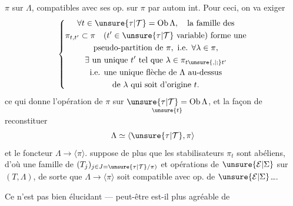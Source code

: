 $\pi$ sur $\Lambda$, compatibles avec ses op. sur $\pi$ par autom int. Pour ceci, on va exiger
\[
\left\{\begin{gathered}
\forall t\in\unsure{\tau|\mathcal T}=\operatorname{Ob}\Lambda,\quad\text{la famille des}\\
\pi_{t,t'}\subset\pi\quad(t'\in\unsure{\tau|\mathcal T}\text{ variable})\text{ forme une}\\
\text{pseudo-partition de }\pi,\text{ i.e. }\forall\lambda\in\pi,\\
\exists\text{ un unique }t'\text{ tel que }\lambda\in\pi_{t\unsure{,|;}t'}\\
\text{i.e. une unique flèche de }\Lambda\text{ au-dessus}\\
\text{de }\lambda\text{ qui soit d'origine }t.
\end{gathered}\right.
\]
ce qui donne l'opération de $\pi$ sur $\underset{\unsure{t}}{\unsure{\tau|\mathcal T}=\operatorname{Ob}\Lambda}$, et la façon de reconstituer
\[
\Lambda\simeq\langle\unsure{\tau|\mathcal T},\pi\rangle
\]
et le foncteur $\Lambda\longrightarrow\langle\pi\rangle$.    suppose de plus que les stabilisateurs $\pi_t$ sont abéliens, d'où une famille de  $(T_j)_{j\in J=\unsure{\tau|\mathcal T}/\pi)}$ et opérations de $\unsure{\mathcal E|\Sigma}$ sur $(T,\Lambda)$, de sorte que $\Lambda\longrightarrow\langle\pi\rangle$ soit compatible avec op. de $\unsure{\mathcal E|\Sigma}$\ldots.

Ce n'est pas bien élucidant --- peut-être est-il plus agréable de
